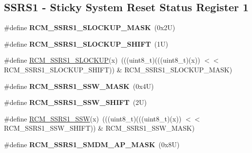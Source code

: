 \subsection*{S\+S\+R\+S1 -\/ Sticky System Reset Status Register 1}
\begin{DoxyCompactItemize}
\item 
\mbox{\label{group___r_c_m___register___masks_ga62a44ef680c74817fcbbd69c3626bfe7}} 
\#define {\bfseries R\+C\+M\+\_\+\+S\+S\+R\+S1\+\_\+\+S\+L\+O\+C\+K\+U\+P\+\_\+\+M\+A\+SK}~(0x2\+U)
\item 
\mbox{\label{group___r_c_m___register___masks_ga61a6c58ab5e1aca8ecbcd53a97296037}} 
\#define {\bfseries R\+C\+M\+\_\+\+S\+S\+R\+S1\+\_\+\+S\+L\+O\+C\+K\+U\+P\+\_\+\+S\+H\+I\+FT}~(1\+U)
\item 
\#define \mbox{\hyperlink{group___r_c_m___register___masks_gaaf502d4b3492d58b6abcc2e15d5ab2fb}{R\+C\+M\+\_\+\+S\+S\+R\+S1\+\_\+\+S\+L\+O\+C\+K\+UP}}(x)~(((uint8\+\_\+t)(((uint8\+\_\+t)(x)) $<$$<$ R\+C\+M\+\_\+\+S\+S\+R\+S1\+\_\+\+S\+L\+O\+C\+K\+U\+P\+\_\+\+S\+H\+I\+FT)) \& R\+C\+M\+\_\+\+S\+S\+R\+S1\+\_\+\+S\+L\+O\+C\+K\+U\+P\+\_\+\+M\+A\+SK)
\item 
\mbox{\label{group___r_c_m___register___masks_gab42f285c8a3a8cf05c5ef90cc1854bf6}} 
\#define {\bfseries R\+C\+M\+\_\+\+S\+S\+R\+S1\+\_\+\+S\+S\+W\+\_\+\+M\+A\+SK}~(0x4\+U)
\item 
\mbox{\label{group___r_c_m___register___masks_ga220b33e9d1e8930bd6b0ee3962949948}} 
\#define {\bfseries R\+C\+M\+\_\+\+S\+S\+R\+S1\+\_\+\+S\+S\+W\+\_\+\+S\+H\+I\+FT}~(2\+U)
\item 
\#define \mbox{\hyperlink{group___r_c_m___register___masks_ga905ff20ab2e1f537f3105ebdcb17576a}{R\+C\+M\+\_\+\+S\+S\+R\+S1\+\_\+\+S\+SW}}(x)~(((uint8\+\_\+t)(((uint8\+\_\+t)(x)) $<$$<$ R\+C\+M\+\_\+\+S\+S\+R\+S1\+\_\+\+S\+S\+W\+\_\+\+S\+H\+I\+FT)) \& R\+C\+M\+\_\+\+S\+S\+R\+S1\+\_\+\+S\+S\+W\+\_\+\+M\+A\+SK)
\item 
\mbox{\label{group___r_c_m___register___masks_ga06d203c80a3379b227fab1d6f423bacb}} 
\#define {\bfseries R\+C\+M\+\_\+\+S\+S\+R\+S1\+\_\+\+S\+M\+D\+M\+\_\+\+A\+P\+\_\+\+M\+A\+SK}~(0x8\+U)
\item 

\end{DoxyCompactItemize}

